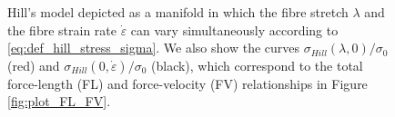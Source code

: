 \documentclass{sfuthesis}
\numberwithin{equation}{section}
\numberwithin{figure}{chapter}
\numberwithin{table}{chapter}
\theoremstyle{definition}
\newcommand{\depsilon}{\dot{\varepsilon}}
\begin{document}
\begin{figure}
    \centering
    \caption{Hill's model depicted as a manifold in which the fibre stretch $\lambda$ and the fibre strain rate $\depsilon$ can vary simultaneously according to \eqref{eq:def_hill_stress_sigma}. We also show the curves $\sigma_{Hill}(\lambda,0)/\sigma_0$ (red) and $\sigma_{Hill}(0,\depsilon)/\sigma_0$ (black), which correspond to the total force-length (FL) and force-velocity (FV) relationships in Figure \ref{fig:plot_FL_FV}. \label{fig:plot_FLV}}
\end{figure}
\end{document}
